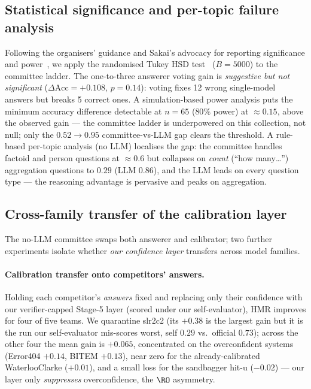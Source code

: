 \documentclass[11pt,a4paper]{article}
\newcommand{\HMR}{\textsc{HMR}}
\begin{document}
\subsection{Statistical significance and per-topic failure analysis}
\label{sec:nollm_stats}
Following the organisers' guidance and Sakai's advocacy for reporting significance and
power~\cite{sakai-sigtest,sakai-reform}, we apply the randomised Tukey HSD
test~\cite{sakai-sigtest} ($B{=}5000$) to the committee ladder. The one-to-three
answerer voting gain is \emph{suggestive but not significant}
($\Delta\text{Acc}{=}{+}0.108$, $p{=}0.14$): voting fixes 12 wrong single-model
answers but breaks 5 correct ones. A simulation-based power analysis puts the minimum
accuracy difference detectable at $n{=}65$ ($80\%$ power) at $\approx0.15$, above the
observed gain --- the committee ladder is underpowered on this collection, not null;
only the $0.52\!\to\!0.95$ committee-vs-LLM gap clears the threshold. A rule-based
per-topic analysis (no LLM) localises the gap: the committee handles factoid and person
questions at $\approx0.6$ but collapses on \emph{count} (``how many\dots'') aggregation
questions to $0.29$ (LLM $0.86$), and the LLM leads on every question type --- the
reasoning advantage is pervasive and peaks on aggregation.

\subsection{Cross-family transfer of the calibration layer}
\label{sec:crossfamily}
The no-LLM committee swaps both answerer and calibrator; two further experiments isolate
whether \emph{our confidence layer} transfers across model families.

\paragraph{Calibration transfer onto competitors' answers.} Holding each competitor's
\emph{answers} fixed and replacing only their confidence with our verifier-capped Stage-5
layer (scored under our self-evaluator), \HMR{} improves for four of five teams. We quarantine
slr2c2 (its $+0.38$ is the largest gain but it is the run our self-evaluator mis-scores worst,
self $0.29$ vs.\ official $0.73$); across the other four the mean gain is $+0.065$, concentrated
on the overconfident systems (Error404 $+0.14$, BITEM $+0.13$), near zero for the
already-calibrated WaterlooClarke ($+0.01$), and a small loss for the sandbagger hit-u
($-0.02$) --- our layer only \emph{suppresses} overconfidence, the $\RO$ asymmetry.
\end{document}
